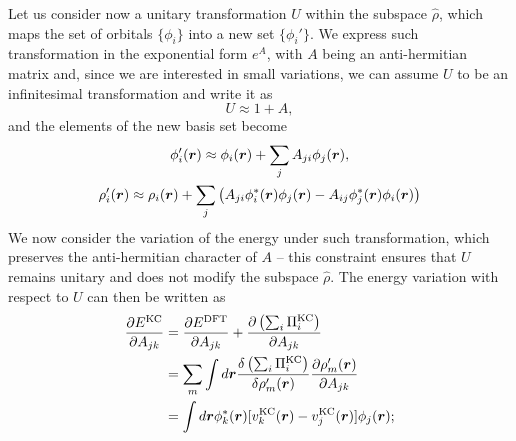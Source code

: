 Let us consider now a unitary transformation $U$ within the subspace $\hat{\rho}$, which maps the set of orbitals $\{ \phi_i \}$ into a new set $\{ \phi_i' \}$. We express such transformation in the exponential form $e^A$, with $A$ being an anti-hermitian matrix and, since we are interested in small variations, we can assume $U$ to be an infinitesimal transformation and write it as
%
\begin{equation}
    U \approx 1 + A ,
    \label{eq:infinitesimal-unitary}
\end{equation}
%
and the elements of the new basis set become
%
\begin{equation}
    \begin{gathered}
    \phi_i'({\bm r}) \approx \phi_i({\bm r}) + \sum_j A_{ji} \phi_j({\bm r}) ,\\
    \rho_i'({\bm r}) \approx \rho_i({\bm r}) + \sum_j \left( A_{ji} \phi_i^*({\bm r}) \phi_j({\bm r}) - A_{ij} \phi_j^*({\bm r}) \phi_i({\bm r}) \right)
    \end{gathered}
    \label{eq:infinitesimal-unitary-orbitals}
\end{equation}
%
We now consider the variation of the energy under such transformation, which preserves the anti-hermitian character of $A$ -- this constraint ensures that $U$ remains unitary and does not modify the subspace $\hat{\rho}$. The energy variation with respect to $U$ can then be written as
%
\begin{equation}
    \begin{split}
    \frac{\partial E^{\rm KC}}{\partial A_{jk}} &= \frac{\partial E^{\rm DFT}}{\partial A_{jk}} + \frac{\partial \left( \sum_i \Pi^{\rm KC}_i \right)}{\partial A_{jk}} \\
    &= \sum_{m} \int d{\bm r} \frac{\delta \left( \sum_i \Pi^{\rm KC}_i \right)}{\delta \rho_m'({\bm r})} \frac{\partial \rho_m'({\bm r})}{\partial A_{jk}} \\
    &= \int d{\bm r} \phi_k^*({\bm r}) [ v^{\rm KC}_k({\bm r}) - v^{\rm KC}_j({\bm r}) ] \phi_j({\bm r}) ;
    \end{split}
    \label{eq:energy-der-unitary}
\end{equation}
%
